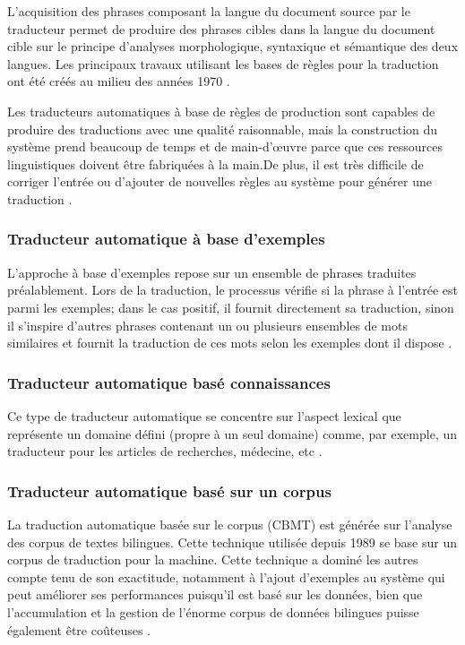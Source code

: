         L'acquisition des phrases composant la langue du document source par le traducteur permet de produire des phrases cibles dans la langue du document cible sur le principe d'analyses morphologique, syntaxique et sémantique des deux langues.
        Les principaux travaux utilisant les bases de règles pour la traduction ont été créés au milieu des années 1970 \cite{surveyTraduction}.

        Les traducteurs automatiques à base de règles de production sont capables de produire des traductions avec une qualité raisonnable, mais la construction du système prend beaucoup de temps et de main-d'œuvre parce que ces ressources linguistiques doivent être fabriquées à la main.De plus, il est très difficile de corriger l'entrée ou d'ajouter de nouvelles règles au système pour générer une traduction \cite{jean}.
        \subsubsection{Traducteur automatique à base d'exemples}
        L'approche à base d'exemples repose sur un ensemble de phrases traduites préalablement. Lors de la traduction, le processus vérifie si la phrase à l'entrée est parmi les exemples; dans le cas positif, il fournit directement sa traduction, sinon il s'inspire d'autres phrases contenant un ou plusieurs ensembles de mots similaires et fournit la traduction de ces mots selon les exemples dont il dispose \cite{gent}.
        \subsubsection{Traducteur automatique basé connaissances}
        Ce type de traducteur automatique se concentre sur l'aspect lexical que représente un domaine défini (propre à un seul domaine) comme, par exemple, un traducteur pour les articles de recherches, médecine, etc \cite{surveyTraduction}.
        \subsubsection{Traducteur automatique basé sur un corpus}
        La traduction automatique basée sur le corpus (CBMT) est générée sur l'analyse des corpus de textes bilingues. Cette technique utilisée depuis 1989 se base sur un corpus de traduction pour la machine. Cette technique a dominé les autres compte tenu de son exactitude, notamment à l'ajout d'exemples au système qui peut améliorer ses performances puisqu'il est basé sur les données, bien que l'accumulation et la gestion de l'énorme corpus de données bilingues puisse également être coûteuses \cite{jean}.
